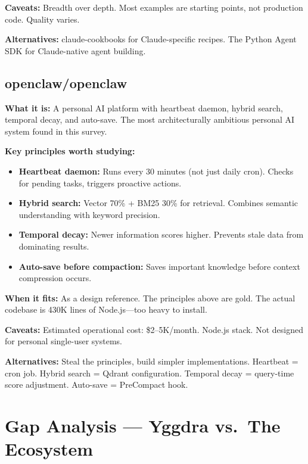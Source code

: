 \documentclass[11pt,a4paper]{article}
\begin{document}
\textbf{Caveats:} Breadth over depth. Most examples are starting points, not production code. Quality varies.

\textbf{Alternatives:} claude-cookbooks for Claude-specific recipes. The Python Agent SDK for Claude-native agent building.

\subsection{openclaw/openclaw}

\textbf{What it is:} A personal AI platform with heartbeat daemon, hybrid search, temporal decay, and auto-save. The most architecturally ambitious personal AI system found in this survey.

\textbf{Key principles worth studying:}
\begin{itemize}
  \item \textbf{Heartbeat daemon:} Runs every 30 minutes (not just daily cron). Checks for pending tasks, triggers proactive actions.
  \item \textbf{Hybrid search:} Vector 70\% + BM25 30\% for retrieval. Combines semantic understanding with keyword precision.
  \item \textbf{Temporal decay:} Newer information scores higher. Prevents stale data from dominating results.
  \item \textbf{Auto-save before compaction:} Saves important knowledge before context compression occurs.
\end{itemize}

\textbf{When it fits:} As a design reference. The principles above are gold. The actual codebase is 430K lines of Node.js---too heavy to install.

\textbf{Caveats:} Estimated operational cost: \$2--5K/month. Node.js stack. Not designed for personal single-user systems.

\textbf{Alternatives:} Steal the principles, build simpler implementations. Heartbeat = cron job. Hybrid search = Qdrant configuration. Temporal decay = query-time score adjustment. Auto-save = PreCompact hook.

\newpage

\section{Gap Analysis --- Yggdra vs.\ The Ecosystem}
\end{document}
